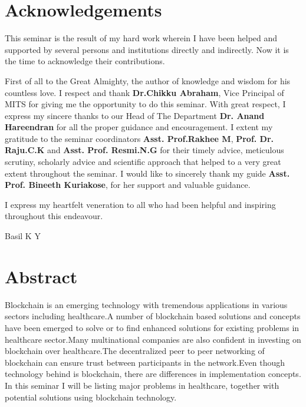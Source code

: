 \documentclass[12pt]{report}
\begin{document}
\section*{\centering Acknowledgements}
\par This seminar is the result of my hard work wherein I have been helped and supported by several persons and institutions directly and indirectly. Now it is the time to acknowledge their contributions. 

\par First of all to the Great Almighty, the author of knowledge and wisdom for his countless love. I respect and thank \textbf{Dr.Chikku Abraham}, Vice Principal of MITS for giving me the opportunity to do this seminar.
With great respect, I express my sincere thanks to our Head of The Department \textbf{Dr. Anand Hareendran} for all the proper guidance and encouragement. I extent my gratitude to the seminar coordinators \textbf{Asst. Prof.Rakhee M}, \textbf{Prof. Dr. Raju.C.K} and \textbf{Asst. Prof. Resmi.N.G} for their timely advice, meticulous scrutiny, scholarly advice and scientific approach that helped to a very great extent throughout the seminar. I would like to sincerely thank my guide \textbf{Asst. Prof. Bineeth Kuriakose}, for her support and valuable guidance.

\par I express my heartfelt veneration to all who had been helpful and inspiring throughout this endeavour.


\null\hfill Basil K Y
\newpage

\section*{\centering Abstract}
Blockchain is an emerging technology with tremendous applications in various sectors including healthcare.A number of blockchain based solutions and concepts have been emerged to solve or to find enhanced solutions for existing problems in healthcare sector.Many multinational companies are also confident in investing on blockchain over healthcare.The decentralized peer to peer networking of blockchain can ensure trust between participants in the network.Even though technology behind is blockchain, there are differences in implementation concepts.
In this seminar I will be listing major problems in healthcare, together with potential solutions using blockchain technology.
\newpage



\tableofcontents
{}
\end{document}
